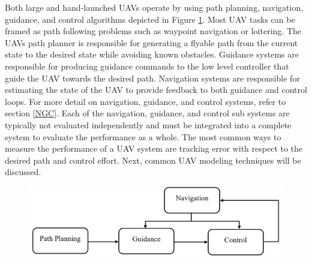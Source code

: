 \documentclass[numbered,pdftex]{ohio-etd}
\begin{document}
Both large and hand-launched UAVs operate by using path planning, navigation, guidance, and control algorithms depicted in Figure \ref{fig:ngcflow}. Most UAV tasks can be framed as path following problems such as waypoint navigation or loitering. The UAVs path planner is responsible for generating a flyable path from the current state to the desired state while avoiding known obstacles. Guidance systems are responsible for producing guidance commands to the low level controller that guide the UAV towards the desired path. Navigation systems are responsible for estimating the state of the UAV to provide feedback to both guidance and control loops. For more detail on navigation, guidance, and control systems, refer to section \ref{NGC}. Each of the navigation, guidance, and control sub systems are typically not evaluated independently and must be integrated into a complete system to evaluate the performance as a whole. The most common ways to measure the performance of a UAV system are tracking error with respect to the desired path and control effort. Next, common UAV modeling techniques will be discussed.


\begin{figure}[]
	\centering
	\includegraphics[width=0.7\linewidth]{PaperFigures/ngcFlow}
	\caption{}
	\label{fig:ngcflow}
\end{figure}
\end{document}
